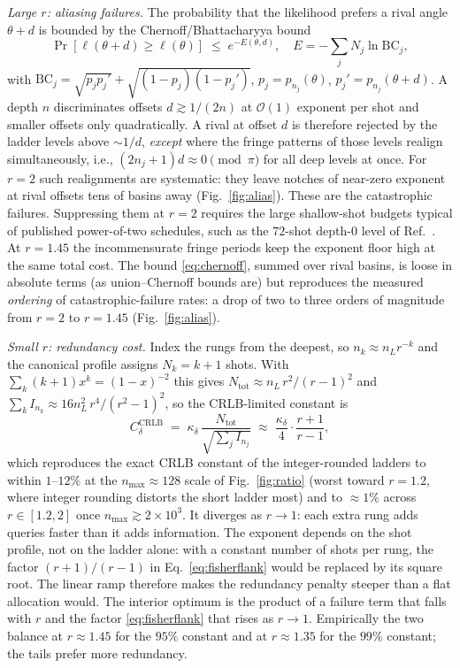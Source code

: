 \documentclass[%
 twocolumn,
 amsmath,amssymb,
prx,
longbibliography
]{revtex4-2}
\newcommand{\Ntot}{N_{\mathrm{tot}}}
\begin{document}
\emph{Large $r$: aliasing failures.} The probability that the likelihood prefers a rival angle $\theta + d$ is bounded by the Chernoff/Bhattacharyya bound
\begin{equation}\label{eq:chernoff}
    \Pr[\ell(\theta + d) \ge \ell(\theta)] \;\le\; e^{-E(\theta, d)},\quad
    E = -\sum_j N_j \ln \mathrm{BC}_j,
\end{equation}
with $\mathrm{BC}_j = \sqrt{p_j p_j'} + \sqrt{(1-p_j)(1-p_j')}$, $p_j = p_{n_j}(\theta)$, $p_j' = p_{n_j}(\theta+d)$. A depth $n$ discriminates offsets $d \gtrsim 1/(2n)$ at $\mathcal{O}(1)$ exponent per shot and smaller offsets only quadratically. A rival at offset $d$ is therefore rejected by the ladder levels above $\sim 1/d$, \emph{except} where the fringe patterns of those levels realign simultaneously, i.e., $(2n_j+1)d \approx 0 \pmod{\pi}$ for all deep levels at once. For $r = 2$ such realignments are systematic: they leave notches of near-zero exponent at rival offsets tens of basins away (Fig.~\ref{fig:alias}). These are the catastrophic failures. Suppressing them at $r=2$ requires the large shallow-shot budgets typical of published power-of-two schedules, such as the $72$-shot depth-$0$ level of Ref.~\cite{labib2024csae}. At $r = 1.45$ the incommensurate fringe periods keep the exponent floor high at the same total cost. The bound \eqref{eq:chernoff}, summed over rival basins, is loose in absolute terms (as union--Chernoff bounds are) but reproduces the measured \emph{ordering} of catastrophic-failure rates: a drop of two to three orders of magnitude from $r = 2$ to $r = 1.45$ (Fig.~\ref{fig:alias}).

\emph{Small $r$: redundancy cost.} Index the rungs from the deepest, so $n_k \approx n_L r^{-k}$ and the canonical profile assigns $N_k = k+1$ shots. With $\sum_k (k+1)x^k = (1-x)^{-2}$ this gives $\Ntot \approx n_L\, r^2/(r-1)^2$ and $\sum_k I_{n_k} \approx 16 n_L^2\, r^4/(r^2-1)^2$, so the \ac{CRLB}-limited constant is
\begin{equation}\label{eq:fisherflank}
    C_\delta^{\mathrm{CRLB}} \;=\; \kappa_\delta\,\frac{\Ntot}{\sqrt{\sum_j I_{n_j}}} \;\approx\; \frac{\kappa_\delta}{4}\cdot\frac{r+1}{r-1},
\end{equation}
which reproduces the exact \ac{CRLB} constant of the integer-rounded ladders to within $1$--$12\%$ at the $n_{\max} \approx 128$ scale of Fig.~\ref{fig:ratio} (worst toward $r = 1.2$, where integer rounding distorts the short ladder most) and to $\approx 1\%$ across $r \in [1.2, 2]$ once $n_{\max} \gtrsim 2\times 10^3$. It diverges as $r \to 1$: each extra rung adds queries faster than it adds information. The exponent depends on the shot profile, not on the ladder alone: with a constant number of shots per rung, the factor $(r+1)/(r-1)$ in Eq.~\eqref{eq:fisherflank} would be replaced by its square root. The linear ramp therefore makes the redundancy penalty steeper than a flat allocation would. The interior optimum is the product of a failure term that falls with $r$ and the factor \eqref{eq:fisherflank} that rises as $r \to 1$. Empirically the two balance at $r \approx 1.45$ for the $95\%$ constant and at $r \approx 1.35$ for the $99\%$ constant; the tails prefer more redundancy.
\end{document}
